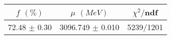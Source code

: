 \begin{tabular}{c|c||c}
 $f$ $(\%)$ & $\mu$ $(MeV)$ & $\chi^2/$ndf \\
\hline
72.48 $\pm$ 0.30 & 3096.749 $\pm$ 0.010 & 5239/1201\\
\end{tabular}
